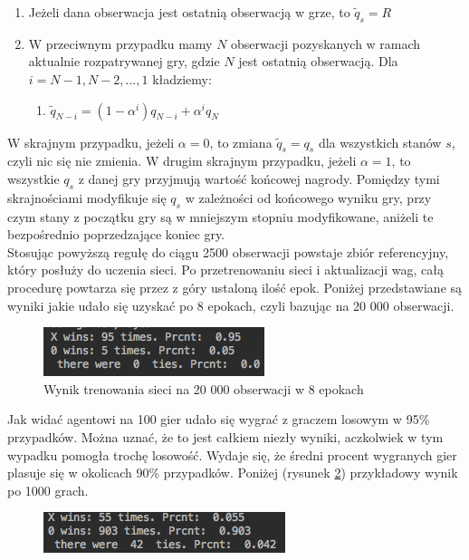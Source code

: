 \documentclass[licencjacka]{pracamgr}
\begin{document}
\begin{enumerate}
	\item{Jeżeli dana obserwacja jest ostatnią obserwacją w grze, to $\tilde{q}_{s}= R$}
	\item{W przeciwnym przypadku mamy  $N$ obserwacji pozyskanych w ramach aktualnie rozpatrywanej gry, gdzie $N$ jest ostatnią obserwacją.  Dla $i=N-1, N-2,...,1$ kładziemy: }
	\begin{enumerate}
		\item{$\tilde{q}_{N-i}= (1-\alpha^{i})q_{N-i} + \alpha^{i}q_{N} $}
	\end{enumerate}
\end{enumerate}
W skrajnym przypadku, jeżeli $\alpha=0$, to zmiana $\tilde{q}_{s}=q_{s}$ dla wszystkich stanów $s$, czyli nic się nie zmienia. W drugim skrajnym przypadku, jeżeli $\alpha=1$, to wszystkie $q_{s}$ z danej gry przyjmują wartość końcowej nagrody. Pomiędzy tymi skrajnościami modyfikuje się $q_{s}$ w zależności od końcowego wyniku gry, przy czym stany z początku gry są w mniejszym stopniu modyfikowane, aniżeli te bezpośrednio poprzedzające koniec gry.  \\

Stosując powyższą regułę do ciągu 2500 obserwacji powstaje zbiór referencyjny, który posłuży do uczenia sieci. Po przetrenowaniu sieci i aktualizacji wag, całą procedurę powtarza się przez z góry ustaloną ilość epok. Poniżej przedstawiane są wyniki jakie udało się uzyskać po 8 epokach, czyli bazując na 20 000 obserwacji.\\

\begin{figure}[h!]
	\includegraphics [scale=0.8] {nn2_1.png}
	\caption{Wynik trenowania sieci na 20 000 obserwacji w 8 epokach}
	\label{Rys30}
\end{figure} 

Jak widać agentowi na 100 gier udało się wygrać z graczem losowym w 95\% przypadków.  Można uznać, że to jest całkiem niezły wyniki, aczkolwiek w tym wypadku pomogła trochę losowość. Wydaje się, że średni procent wygranych gier plasuje się w okolicach 90\% przypadków. Poniżej (rysunek \ref{Rys31}) przykładowy wynik po 1000 grach. \\

\begin{figure}[h!]
	\includegraphics [scale=0.8] {nn2_2.png}
	\caption{}
	\label{Rys31}
\end{figure} 
\end{document}
